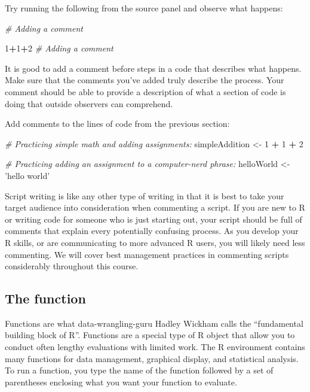 \documentclass[]{article}
\newenvironment{Shaded}{\begin{snugshade}}{\end{snugshade}}
\newcommand{\DecValTok}[1]{\textcolor[rgb]{0.00,0.00,0.81}{#1}}
\newcommand{\StringTok}[1]{\textcolor[rgb]{0.31,0.60,0.02}{#1}}
\newcommand{\CommentTok}[1]{\textcolor[rgb]{0.56,0.35,0.01}{\textit{#1}}}
\newcommand{\OperatorTok}[1]{\textcolor[rgb]{0.81,0.36,0.00}{\textbf{#1}}}
\newcommand{\NormalTok}[1]{#1}
\begin{document}
 Try running the following from the source panel and observe what
happens:

\begin{Shaded}
\begin{Highlighting}[]
\CommentTok{# Adding a comment}

\DecValTok{1}\OperatorTok{+}\DecValTok{1}\OperatorTok{+}\DecValTok{2} \CommentTok{# Adding a comment}
\end{Highlighting}
\end{Shaded}

It is good to add a comment before steps in a code that describes what
happens. Make sure that the comments you've added truly describe the
process. Your comment should be able to provide a description of what a
section of code is doing that outside observers can comprehend.

 Add comments to the lines of code from the previous section:

\begin{Shaded}
\begin{Highlighting}[]
\CommentTok{# Practicing simple math and adding assignments:}
\NormalTok{simpleAddition <-}\StringTok{ }
\StringTok{  }\DecValTok{1} \OperatorTok{+}\StringTok{ }\DecValTok{1} \OperatorTok{+}\StringTok{ }\DecValTok{2}

\CommentTok{# Practicing adding an assignment to a computer-nerd phrase:}
\NormalTok{helloWorld <-}\StringTok{ }
\StringTok{  'hello world'}
\end{Highlighting}
\end{Shaded}

 Script writing is like any other type of writing in that it is best to
take your target audience into consideration when commenting a script.
If you are new to R or writing code for someone who is just starting
out, your script should be full of comments that explain every
potentially confusing process. As you develop your R skills, or are
communicating to more advanced R users, you will likely need less
commenting. We will cover best management practices in commenting
scripts considerably throughout this course.

\subsection{The function}\label{the-function}

Functions are what data-wrangling-guru Hadley Wickham calls the
``fundamental building block of R''. Functions are a special type of R
object that allow you to conduct often lengthy evaluations with limited
work. The R environment contains many functions for data management,
graphical display, and statistical analysis. To run a function, you type
the name of the function followed by a set of parentheses enclosing what
you want your function to evaluate.
\end{document}
